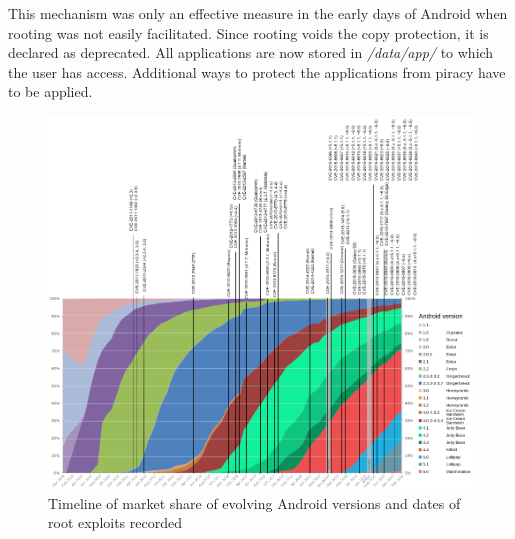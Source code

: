 This mechanism was only an effective measure in the early days of Android when rooting was not easily facilitated.
\newline
Since rooting voids the copy protection, it is declared as deprecated.
All applications are now stored in \textit{/data/app/} to which the user has access.
Additional ways to protect the applications from piracy have to be applied.
\newpage
\begin{figure}[h]
    \centering
    \includegraphics[width=1\textwidth]{data/timeline.png}
    \caption{Timeline of market share of evolving Android versions and dates of root exploits recorded \cite{distributionRoot} \cite{androidVulnerabilities} \cite{cveAndroidPriv} \cite{cveDetails}}
    \label{fig:root}
\end{figure}
